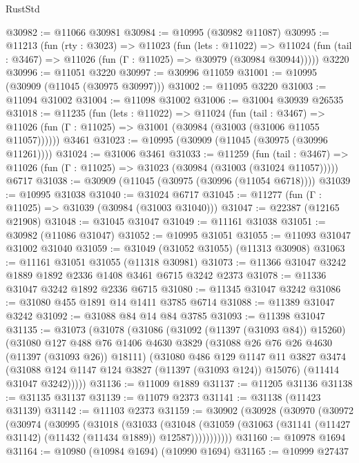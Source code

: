 \begin{lexlean}{RustStd}
\begin{coremodule}
@30982 := @11066 @30981
@30984 := @10995 (@30982 @11087)
@30995 := @11213
    (fun (rty : @3023) =>
    @11023
      (fun (lets : @11022) =>
      @11024 (fun (tail : @3467) => @11026 (fun (Γ : @11025) => @30979 (@30984 @30944)))))
    @3220
@30996 := @11051 @3220
@30997 := @30996 @11059
@31001 := @10995 (@30909 (@11045 (@30975 @30997)))
@31002 := @11095 @3220
@31003 := @11094 @31002
@31004 := @11098 @31002
@31006 := @31004 @30939 @26535
@31018 := @11235
    (fun (lets : @11022) =>
    @11024
      (fun (tail : @3467) =>
      @11026 (fun (Γ : @11025) => @31001 (@30984 (@31003 (@31006 @11055 @11057))))))
    @3461
@31023 := @10995 (@30909 (@11045 (@30975 (@30996 @11261))))
@31024 := @31006 @3461
@31033 := @11259
    (fun (tail : @3467) => @11026 (fun (Γ : @11025) => @31023 (@30984 (@31003 (@31024 @11057)))))
    @6717
@31038 := @30909 (@11045 (@30975 (@30996 (@11054 @6718))))
@31039 := @10995 @31038
@31040 := @31024 @6717
@31045 := @11277 (fun (Γ : @11025) => @31039 (@30984 (@31003 @31040)))
@31047 := @22387 (@12165 @21908)
@31048 := @31045 @31047
@31049 := @11161 @31038
@31051 := @30982 (@11086 @31047)
@31052 := @10995 @31051
@31055 := @11093 @31047 @31002 @31040
@31059 := @31049 (@31052 @31055) (@11313 @30908)
@31063 := @11161 @31051 @31055 (@11318 @30981)
@31073 := @11366 @31047 @3242 @1889 @1892 @2336 @1408 @3461 @6715 @3242 @2373
@31078 := @11336 @31047 @3242 @1892 @2336 @6715
@31080 := @11345 @31047 @3242
@31086 := @31080 @455 @1891 @14 @1411 @3785 @6714
@31088 := @11389 @31047 @3242
@31092 := @31088 @84 @14 @84 @3785
@31093 := @11398 @31047
@31135 := @31073
    (@31078
      (@31086
        (@31092 (@11397 (@31093 @84)) @15260)
        (@31080
          @127
          @488
          @76
          @1406
          @4630
          @3829
          (@31088 @26 @76 @26 @4630 (@11397 (@31093 @26)) @18111)
          (@31080
            @486
            @129
            @1147
            @11
            @3827
            @3474
            (@31088 @124 @1147 @124 @3827 (@11397 (@31093 @124)) @15076)
            (@11414 @31047 @3242)))))
@31136 := @11009 @1889
@31137 := @11205 @31136
@31138 := @31135 @31137
@31139 := @11079 @2373
@31141 := @31138 (@11423 @31139)
@31142 := @11103 @2373
@31159 := @30902
    (@30928
      (@30970
        (@30972
          (@30974
            (@30995
              (@31018
                (@31033
                  (@31048
                    (@31059
                      (@31063 (@31141 (@11427 @31142) (@11432 (@11434 @1889)) @12587)))))))))))
@31160 := @10978 @1694
@31164 := @10980 (@10984 @1694) (@10990 @1694)
@31165 := @10999 @27437

\end{coremodule}
\end{lexlean}
